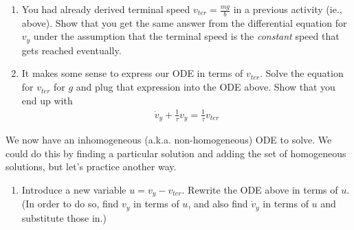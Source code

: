 \documentclass[12pt]{article}
\begin{document}
\begin{enumerate}
\begin{enumerate}

    \item You had already derived terminal speed $v_{ter} = \frac{mg}{b}$ in a previous activity (ie., above). Show that you get the same answer from the differential equation for $v_y$ under the assumption that the terminal speed is the \textit{constant} speed that gets reached eventually.


    \item It makes some sense to express our ODE in terms of $v_{ter}$. Solve the equation for $v_{ter}$ for $g$ and plug that expression into the ODE above. Show that you end up with
    \begin{align}
        \dot v_y + \frac{1}{\tau} v_y = \frac{1}{\tau} v_{ter}
    \end{align}

  \end{enumerate}

    We now have an inhomogeneous (a.k.a. non-homogeneous) ODE to solve. We could do this by finding a particular solution and adding the set of homogeneous solutions, but let's practice another way.

  \begin{enumerate}[resume]

    \item Introduce a new variable $u = v_y - v_{ter}$. Rewrite the ODE above in terms of $u$. (In order to do so, find $v_y$ in terms of $u$, and also find $\dot v_y$ in terms of $u$ and substitute those in.)

\end{enumerate}
\end{enumerate}
\end{document}
